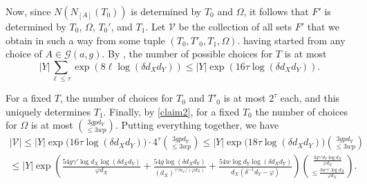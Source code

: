 \documentclass[10pt,a4paper]{amsart}
\theoremstyle{definition}
\newcommand{\0}[0]{\emptyset}
\begin{document}
Now, since $N(N_{[A]}(T_0))$ is determined by $T_0$ and $\Omega$, it follows that $F'$ is determined by $T_0$, $\Omega$, $T_0'$, and $T_1$. Let $\mathcal{V}$ be the collection of all sets $F'$ that we obtain in such a way from some tuple $(T_0, T'_0, T_1, \Omega)$. having started from any choice of $A\in \mathcal{G}(a,g)$. By , the number of possible choices for $T$ is at most
\[ |Y|\sum_{\ell\leq \tau} \exp(8\ell \log (\delta d_Xd_Y)) \leq |Y|\exp(16\tau\log (\delta d_Xd_Y)). \]

For a fixed $T$, the number of choices for $T_0$ and $T'_0$ is at most $2^{\tau}$ each, and this uniquely determines $T_1$. Finally, by \eqref{claim2}, for a fixed $T_0$ the number of choices for $\Omega$ is at most $\binom{3gpd_Y}{\leq 3wp}.$ Putting everything together, we have
\begin{align*}
    |\mathcal{V}| \leq |Y| \exp\big(16\tau\log (\delta d_Xd_Y)\big) \cdot 4^{\tau} \binom{3gpd_Y}{\leq 3wp} \leq |Y| \exp\big(18\tau\log (\delta d_Xd_Y)\big) \binom{3gpd_Y}{\leq 3wp} \\ \leq |Y| \exp\left( \frac{54g\gamma'\log d_X \log (\delta d_Xd_Y)}{\varphi d_X} + \frac{54g\log (\delta d_Xd_Y)}{(d_X)^{\gamma'm_\varphi/(\varphi d_X)}}+\frac{54w\log d_Y \log (\delta d_Xd_Y)}{d_X(\delta^{-1}d_Y-\varphi)} \right) \displaystyle\binom{\frac{3g\gamma'd_Y \log d_X}{\varphi d_X}}{\leq\frac{ 3w\gamma' \log d_X}{\varphi d_X}}.
\end{align*}
\newline




\end{document}
